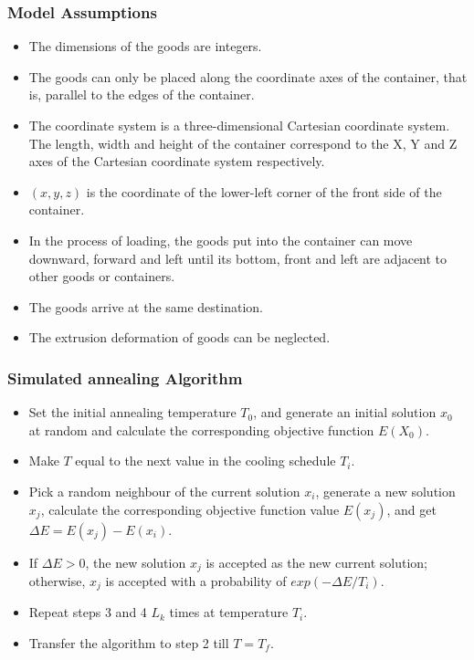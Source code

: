 \documentclass{mcmthesis}
\begin{document}
\subsubsection{Model Assumptions}
\begin{itemize}
	\item The dimensions of the goods are integers.
	\item The goods can only be placed along the coordinate axes of the container, that is, parallel to the edges of the container.
	\item The coordinate system is a three-dimensional Cartesian coordinate system. The length, width and height of the container correspond to the X, Y and Z axes of the Cartesian coordinate system respectively.
	\item $(x, y, z)$ is the coordinate of the lower-left corner of the front side of the container.
	\item In the process of loading, the goods put into the container can move downward, forward and left until its bottom, front and left are adjacent to other goods or containers.
	\item The goods arrive at the same destination.
	\item The extrusion deformation of goods can be neglected.
\end{itemize}

\subsubsection{Simulated annealing Algorithm}
\begin{itemize}
	\item Set the initial annealing temperature $T_0$, and generate an initial solution $x_0$ at random and calculate the corresponding objective function $E(X_0)$.
	\item Make $T$ equal to the next value in the cooling schedule $T_i$.
	\item Pick a random neighbour of the current solution $x_i$, generate a new solution $x_j$, calculate the corresponding objective function value $E(x_j)$, and get $\Delta E=E(x_j)-E(x_i)$.
	\item If  $\Delta E > 0$, the new solution $x_j$ is accepted as the new current solution; otherwise, $x_j$ is accepted with a probability of $exp(-\Delta E/T_i)$. 
	\item Repeat steps 3 and 4 $L_k$ times at temperature $T_i$.
	\item Transfer the algorithm  to step 2 till $T=T_f$.
\end{itemize}
\end{document}
